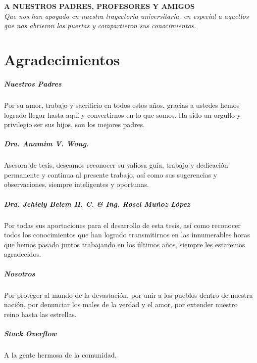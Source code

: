 \chapter*{}
\begin{flushright}
	\vfill
	\textbf{A NUESTROS PADRES, PROFESORES Y AMIGOS}\\
	\textit{Que nos han apoyado en nuestra trayectoria universitaria, en especial a aquellos\\ que nos abrieron las puertas y compartieron sus conocimientos.}
	\vfill
\end{flushright}

\chapter*{Agradecimientos}
\vskip 1cm

\paragraph{Nuestros Padres}

Por su amor, trabajo y sacrificio en todos estos años, gracias a ustedes hemos logrado llegar hasta aquí y convertirnos en lo que somos. Ha sido un orgullo y privilegio ser sus hijos, son los mejores padres.
\newline

\paragraph{Dra. Anamim V. Wong.}

Asesora de tesis, deseamos reconocer su valiosa guía, trabajo y dedicación permanente y continua al presente trabajo, así como sus sugerencias y observaciones, siempre inteligentes y oportunas.
\newline

\paragraph{Dra. Jehiely Belem H. C.  \& Ing. Rosel Muñoz López}

Por todas sus aportaciones para el desarrollo de esta tesis, así como reconocer todos los conocimientos que han logrado transmitirnos en las innumerables horas que hemos pasado juntos trabajando en los últimos años, siempre les estaremos agradecidos.
\newline

\paragraph{Nosotros}

Por proteger al mundo de la devastación, por unir a los pueblos dentro de nuestra nación, por denunciar los males de la verdad y el amor, por extender nuestro reino hasta las estrellas. 
\newline

\paragraph{Stack Overflow}
A la gente hermosa de la comunidad.
